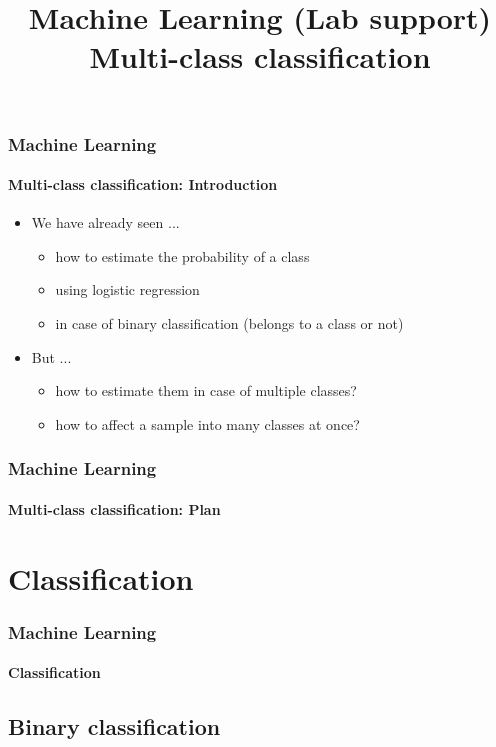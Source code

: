 \documentclass[xcolor=table]{beamer}
\title[ML-TP: Multi-class classification] %
{Machine Learning (Lab support)\\Multi-class classification}
\begin{document}
	
\begin{frame}
	\frametitle{Machine Learning}
	\framesubtitle{Multi-class classification: Introduction}
	
	\begin{itemize}
		\item We have already seen ...
		\begin{itemize}
			\item how to estimate the probability of a class
			\item using logistic regression
			\item in case of binary classification (belongs to a class or not)
		\end{itemize}
		\item But ...
		\begin{itemize}
			\item how to estimate them in case of multiple classes?
			\item how to affect a sample into many classes at once?
		\end{itemize}

	\end{itemize}
\end{frame}


\begin{frame}
	\frametitle{Machine Learning}
	\framesubtitle{Multi-class classification: Plan}
	
	\begin{multicols}{2}
		\tableofcontents
	\end{multicols}
\end{frame}

\section{Classification}

\begin{frame}
	\frametitle{Machine Learning}
	\framesubtitle{Classification}
	
	
\end{frame}

\subsection{Binary classification}
\end{document}
